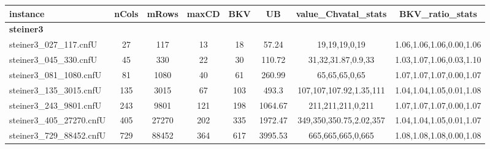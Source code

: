 \begin{table*}[t!]  %
  \vspace*{-6ex}
  \centering
  \small{
  \hspace*{-0em}
  \begin{tabular}{lccccccc} %
    \toprule
    instance & nCols & mRows & maxCD & BKV & UB & value\_Chvatal\_stats  & BKV\_ratio\_stats\\
    \midrule
    {\bf steiner3} &  &  &  &  &  & &\\ 
 steiner3\_027\_117.cnfU & 27 & 117 & 13 & 18 & 57.24 & 19,19,19,0,19 & 1.06,1.06,1.06,0.00,1.06 \\ 
 steiner3\_045\_330.cnfU & 45 & 330 & 22 & 30 & 110.72 & 31,32,31.87,0.9,33 & 1.03,1.07,1.06,0.03,1.10 \\ 
 steiner3\_081\_1080.cnfU & 81 & 1080 & 40 & 61 & 260.99 & 65,65,65,0,65 & 1.07,1.07,1.07,0.00,1.07 \\ 
 steiner3\_135\_3015.cnfU & 135 & 3015 & 67 & 103 & 493.3 & 107,107,107.92,1.35,111 & 1.04,1.04,1.05,0.01,1.08 \\ 
 steiner3\_243\_9801.cnfU & 243 & 9801 & 121 & 198 & 1064.67 & 211,211,211,0,211 & 1.07,1.07,1.07,0.00,1.07 \\ 
 steiner3\_405\_27270.cnfU & 405 & 27270 & 202 & 335 & 1972.47 & 349,350,350.75,2.02,357 & 1.04,1.04,1.05,0.01,1.07 \\ 
 steiner3\_729\_88452.cnfU & 729 & 88452 & 364 & 617 & 3995.53 & 665,665,665,0,665 & 1.08,1.08,1.08,0.00,1.08 \\ 

\midrule


\end{tabular}}
\end{table*}
